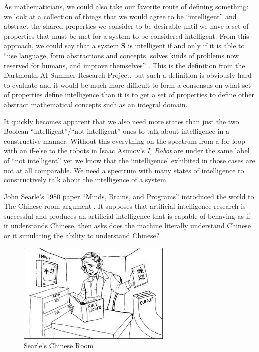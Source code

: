\documentclass[oneside,12pt,openany]{book}
\begin{document}
	As mathematicians, we could also take our favorite route of defining something: we look at a collection of things that we would agree to be ``intelligent'' and abstract the shared properties we consider to be desirable until we have a set of properties that must be met for a system to be considered intelligent. From this approach, we could say that a system \textbf{S} is intelligent if and only if it is able to ``use language, form abstractions and concepts, solves kinds of problems now reserved for humans, and improve themselves'' \cite{Jones}. This is the definition from the Dartmouth AI Summer Research Project, but such a definition is obviously hard to evaluate and it would be much more difficult to form a consensus on what set of properties define intelligence than it is to get a set of properties to define other abstract mathematical concepts such as an integral domain.
	
	It quickly becomes apparent that we also need more states than just the two Boolean ``intelligent''/``not intelligent'' ones to talk about intelligence in a constructive manner. Without this everything on the spectrum from a for loop with an if-else to the robots in Isaac Asimov's \textit{I, Robot}  are under the same label of ``not intelligent'' yet we know that the `intelligence' exhibited in those cases are not at all comparable. We need a spectrum with many states of intelligence to constructively talk about the intelligence of a system.
	
	John Searle's 1980 paper ``Minds, Brains, and Programs'' introduced the world to The Chinese room argument \cite{Searle}. It supposes that artificial intelligence research is successful and produces an artificial intelligence that is capable of behaving as if it understands Chinese, then asks does the machine literally understand Chinese or it simulating the ability to understand Chinese? \cite{Searle} 
	
	\begin{figure}[!ht]
		\centering
		\includegraphics[width=.4\linewidth]{images/ChineseRoom.jpg}
		\caption[Searle's Chinese Room]{Searle's Chinese Room\footnotemark}
		\label{fig:ChineseRoom}
	\end{figure}
	
\end{document}
